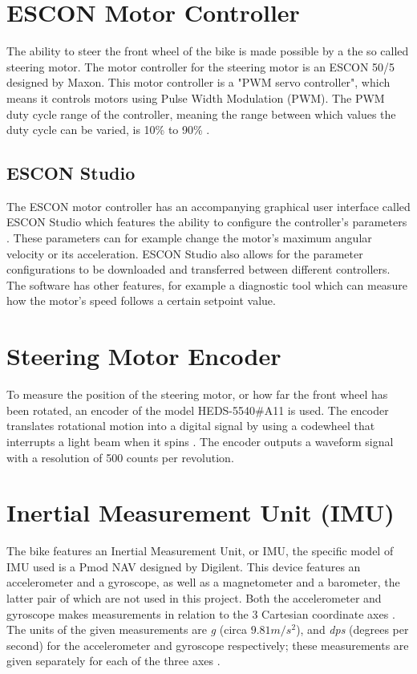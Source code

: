 \section{ESCON Motor Controller}
The ability to steer the front wheel of the bike is made possible by a the so called steering motor. The motor controller for the steering motor is an ESCON 50/5 designed by Maxon. This motor controller is a "PWM servo controller", which means it controls motors using Pulse Width Modulation (PWM). The PWM duty cycle range of the controller, meaning the range between which values the duty cycle can be varied, is 10\% to 90\% \cite{Maxon2021ESCONReference}.

\subsection{ESCON Studio}

The ESCON motor controller has an accompanying graphical user interface called ESCON Studio which features the ability to configure the controller's parameters \cite{ESCON2014ESCONOverview}. These parameters can for example change the motor's maximum angular velocity or its acceleration. ESCON Studio also allows for the parameter configurations to be downloaded and transferred between different controllers. The software has other features, for example a diagnostic tool which can measure how the motor's speed follows a certain setpoint value.

\section{Steering Motor Encoder} \label{theory:encoder}
To measure the position of the steering motor, or how far the front wheel has been rotated, an encoder of the model HEDS-5540\#A11 is used. The encoder translates rotational motion into a digital signal by using a codewheel that interrupts a light beam when it spins \cite{AvagoTechnologies2014HEDM-55xx/560xHEDS-55xx/56xx}. The encoder outputs a waveform signal with a resolution of 500 counts per revolution.

\section{Inertial Measurement Unit (IMU)}
The bike features an Inertial Measurement Unit, or IMU, the specific model of IMU used is a Pmod NAV designed by Digilent. This device features an accelerometer and a gyroscope, as well as a magnetometer and a barometer, the latter pair of which are not used in this project. Both the accelerometer and gyroscope makes measurements in relation to the 3 Cartesian coordinate axes \cite{Digilent2017PmodManual}. The units of the given measurements are \textit{g} (circa $9.81 m/s^2$), and \textit{dps} (degrees per second) for the accelerometer and gyroscope respectively; these measurements are given separately for each of the three axes \cite{STMicroelectronics2015INEMOMagnetometer}.


